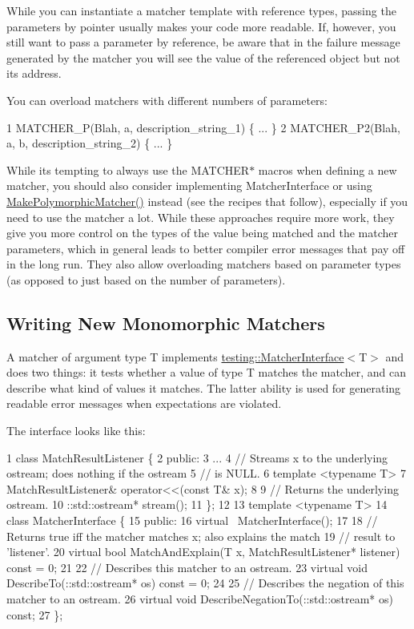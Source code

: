 While you can instantiate a matcher template with reference types, passing the parameters by pointer usually makes your code more readable. If, however, you still want to pass a parameter by reference, be aware that in the failure message generated by the matcher you will see the value of the referenced object but not its address.

You can overload matchers with different numbers of parameters\+: 
\begin{DoxyCode}
1 MATCHER\_P(Blah, a, description\_string\_1) \{ ... \}
2 MATCHER\_P2(Blah, a, b, description\_string\_2) \{ ... \}
\end{DoxyCode}


While it\textquotesingle{}s tempting to always use the {\ttfamily M\+A\+T\+C\+H\+E\+R$\ast$} macros when defining a new matcher, you should also consider implementing {\ttfamily Matcher\+Interface} or using {\ttfamily \hyperlink{namespacetesting_a667ca94f190ec2e17ee2fbfdb7d3da04}{Make\+Polymorphic\+Matcher()}} instead (see the recipes that follow), especially if you need to use the matcher a lot. While these approaches require more work, they give you more control on the types of the value being matched and the matcher parameters, which in general leads to better compiler error messages that pay off in the long run. They also allow overloading matchers based on parameter types (as opposed to just based on the number of parameters).

\subsection*{Writing New Monomorphic Matchers}

A matcher of argument type {\ttfamily T} implements {\ttfamily \hyperlink{classtesting_1_1MatcherInterface}{testing\+::\+Matcher\+Interface}$<$T$>$} and does two things\+: it tests whether a value of type {\ttfamily T} matches the matcher, and can describe what kind of values it matches. The latter ability is used for generating readable error messages when expectations are violated.

The interface looks like this\+:


\begin{DoxyCode}
1 class MatchResultListener \{
2  public:
3   ...
4   // Streams x to the underlying ostream; does nothing if the ostream
5   // is NULL.
6   template <typename T>
7   MatchResultListener& operator<<(const T& x);
8 
9   // Returns the underlying ostream.
10   ::std::ostream* stream();
11 \};
12 
13 template <typename T>
14 class MatcherInterface \{
15  public:
16   virtual ~MatcherInterface();
17 
18   // Returns true iff the matcher matches x; also explains the match
19   // result to 'listener'.
20   virtual bool MatchAndExplain(T x, MatchResultListener* listener) const = 0;
21 
22   // Describes this matcher to an ostream.
23   virtual void DescribeTo(::std::ostream* os) const = 0;
24 
25   // Describes the negation of this matcher to an ostream.
26   virtual void DescribeNegationTo(::std::ostream* os) const;
27 \};
\end{DoxyCode}


